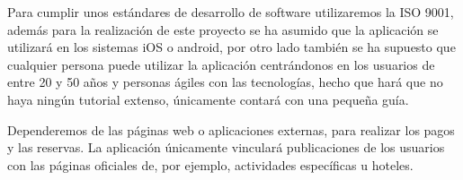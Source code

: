 \documentclass[11pt]{article}
\begin{document}
Para cumplir unos estándares de desarrollo de software utilizaremos la ISO 9001, además para la realización de este proyecto se ha asumido que la aplicación  se utilizará en los sistemas iOS o android, por otro lado también se ha supuesto que cualquier persona puede utilizar la aplicación centrándonos en los usuarios de entre 20 y 50 años y personas ágiles con las tecnologías, hecho que hará que no haya ningún tutorial extenso, únicamente contará con una pequeña guía.

Dependeremos de las páginas web o aplicaciones externas, para realizar los pagos y las reservas. La aplicación únicamente vinculará publicaciones de los usuarios con las páginas oficiales de, por ejemplo, actividades específicas u hoteles. 
\end{document}
